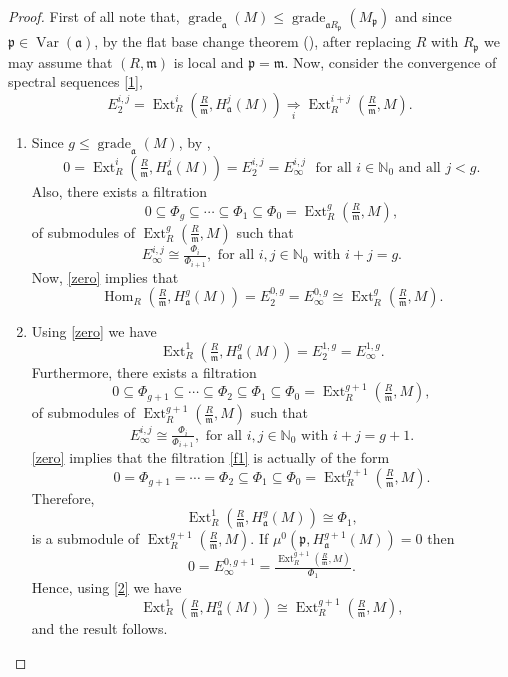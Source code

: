 \documentclass[12pt,twoside, final]{amsart}
\numberwithin{equation}{section}
\newtheorem{nota rem}[thm]{Notation and Remark}
\newtheorem{defen rem}[thm]{Definition and Remark}
\def\Ext{\operatorname{Ext}}
\def\Hom{\operatorname{Hom}}
\def\grade{\operatorname{grade}}
\def\var{\operatorname{Var}}
\newcommand{\p}{\mathfrak{p}}
\newcommand{\fa}{\mathfrak{a}}
\newcommand{\m}{\mathfrak{m}}
\newcommand{\NN}{\mathbb{N}}
\begin{document}
\begin{proof}
First of all note that, $\grade_{\fa}(M)\leq \grade_{\fa R_{\p}}(M_{\p})$ and since $\p\in \var(\fa)$, by  the flat base change theorem (\cite[Theorem 4. 3. 2]{bsh}), after replacing $R$ with $R_{\p}$ we may assume that $(R, \m)$ is local and $\p= \m$. Now, consider the convergence of spectral sequences \ref{1},
\[ E_2^{i, j}= \Ext^i_{R }(\tfrac{R}{\m}, H^j_{\fa}(M))\underset{i}{\Rightarrow}\Ext^{i+ j}_{R}(\tfrac{R}{\m}, M).\]
 \begin{enumerate}
     \item Since $g\leq \grade_{\fa}(M)$, by \cite[Theorem 6. 2. 7]{bsh},
     \begin{equation}\label{zero}
       0= \Ext^i_{R }(\tfrac{R}{\m}, H^j_{\fa}(M))= E_2^{i, j}=  E_{\infty}^{i, j} \,\,\,\,\text{for all}\,\,i\in \NN_0\,\,\text{and all}\,\,j< g.
     \end{equation}
     Also, there exists a filtration 
 \[0\subseteq \Phi_{g} \subseteq\cdots\subseteq \Phi_{   1} \subseteq\Phi_{0}= \Ext^{g}_{R}(\tfrac{R}{\m}, M),\]
 of submodules of $\Ext^{g}_{R}(\tfrac{R}{\m}, M)$ such that 
 \begin{equation*}
     E_{\infty}^{i, j}\cong \tfrac{\Phi_{i}}{\Phi_{i+ 1}},\,\,\text{for all}\,\,i, j\in \NN_0\,\,\text{with}\,\,i+ j= g.
 \end{equation*}
 Now, \ref{zero} implies that 
 \[\Hom_{R }(\tfrac{R}{\m}, H^g_{\fa}(M))=  E_2^{0, g}= E_{\infty}^{0, g}\cong  \Ext^{g}_{R}(\tfrac{R}{\m}, M).\]
 \item Using \ref{zero} we have 
 \[\Ext^1_{R }(\tfrac{R}{\m}, H^g_{\fa}(M))= E_2^{1, g}=  E_{\infty}^{1, g}.\]
 Furthermore, there exists a filtration 
 \begin{equation}\label{f1}
     0\subseteq \Phi_{g+ 1} \subseteq\cdots\subseteq \Phi_{   2} \subseteq\Phi_{   1} \subseteq\Phi_{0}= \Ext^{g+ 1}_{R}(\tfrac{R}{\m}, M),
 \end{equation}
 of submodules of $\Ext^{g+ 1}_{R}(\tfrac{R}{\m}, M)$ such that 
 \begin{equation*}
     E_{\infty}^{i, j}\cong \tfrac{\Phi_{i}}{\Phi_{i+ 1}},\,\,\text{for all}\,\,i, j\in \NN_0\,\,\text{with}\,\,i+ j= g+ 1.
 \end{equation*}
 \ref{zero} implies that the filtration \ref{f1} is actually of the form
 \[ 0= \Phi_{g+ 1} =\cdots= \Phi_{   2} \subseteq\Phi_{   1} \subseteq\Phi_{0}= \Ext^{g+ 1}_{R}(\tfrac{R}{\m}, M).\]
 Therefore,
\begin{equation}\label{2}
    \Ext^1_{R }(\tfrac{R}{\m}, H^g_{\fa}(M))\cong \Phi_{   1},
\end{equation}
 is a submodule of $\Ext^{g+ 1}_{R}(\tfrac{R}{\m}, M)$. If $\mu^0(\p, H^{g+ 1}_{\fa}(M))= 0$ then 
 \[0= E_{\infty}^{0, g+ 1}= \tfrac{\Ext^{g+ 1}_{R}(\tfrac{R}{\m}, M)}{\Phi_{  1}}.\]
 Hence, using \ref{2} we have 
 \[ \Ext^1_{R }(\tfrac{R}{\m}, H^g_{\fa}(M))\cong \Ext^{g+ 1}_{R}(\tfrac{R}{\m}, M),\]
 and the result follows.
 

\end{enumerate}
\end{proof}
\end{document}
